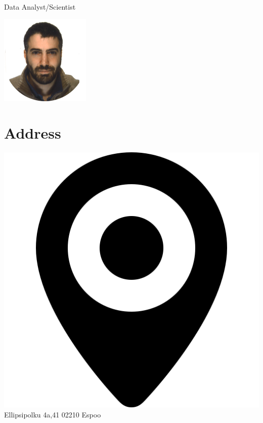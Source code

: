 \documentclass[]{friggeri-cv}
\begin{document}
      {Data Analyst/Scientist}
      

\begin{aside}
\includegraphics[scale=0.65]{img/foto.png}
  \section{Address}
    \includegraphics[scale=0.015]{img/home.png}Ellipsipolku 4a,41
     02210 Espoo
    ~

\end{aside}
\end{document}
